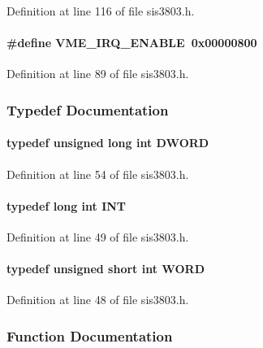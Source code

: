 Definition at line 116 of file sis3803.h.
\paragraph[{VME\_\-IRQ\_\-ENABLE}]{\setlength{\rightskip}{0pt plus 5cm}\#define VME\_\-IRQ\_\-ENABLE~0x00000800}\hfill\label{sis3803_8h_abe651a9664cbb258631e2fbc4501f200}


Definition at line 89 of file sis3803.h.

\subsubsection{Typedef Documentation}
\paragraph[{DWORD}]{\setlength{\rightskip}{0pt plus 5cm}typedef unsigned long int {\bf DWORD}}\hfill\label{sis3803_8h_a408a2366473807fbe658ba18e75dea66}


Definition at line 54 of file sis3803.h.
\paragraph[{INT}]{\setlength{\rightskip}{0pt plus 5cm}typedef long int {\bf INT}}\hfill\label{sis3803_8h_a09fddde158a3a20bd2dcadb609de11dc}


Definition at line 49 of file sis3803.h.
\paragraph[{WORD}]{\setlength{\rightskip}{0pt plus 5cm}typedef unsigned short int {\bf WORD}}\hfill\label{sis3803_8h_a2b0e863dadf920709ec53d9088ee7c91}


Definition at line 48 of file sis3803.h.

\subsubsection{Function Documentation}
